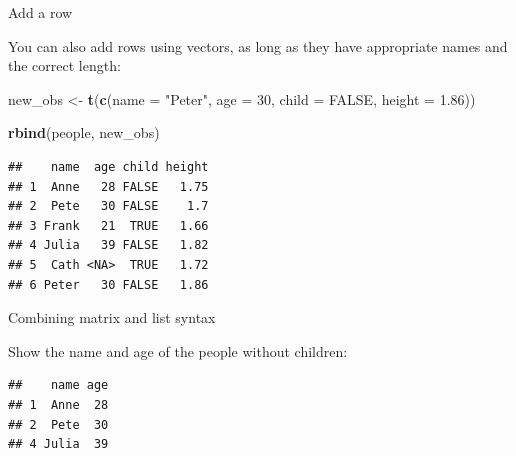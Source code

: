\documentclass[ignorenonframetext,]{beamer}
\newenvironment{Shaded}{\begin{snugshade}}{\end{snugshade}}
\newcommand{\DataTypeTok}[1]{\textcolor[rgb]{0.13,0.29,0.53}{#1}}
\newcommand{\DecValTok}[1]{\textcolor[rgb]{0.00,0.00,0.81}{#1}}
\newcommand{\FloatTok}[1]{\textcolor[rgb]{0.00,0.00,0.81}{#1}}
\newcommand{\KeywordTok}[1]{\textcolor[rgb]{0.13,0.29,0.53}{\textbf{#1}}}
\newcommand{\NormalTok}[1]{#1}
\newcommand{\OperatorTok}[1]{\textcolor[rgb]{0.81,0.36,0.00}{\textbf{#1}}}
\newcommand{\OtherTok}[1]{\textcolor[rgb]{0.56,0.35,0.01}{#1}}
\newcommand{\StringTok}[1]{\textcolor[rgb]{0.31,0.60,0.02}{#1}}
\begin{document}
\begin{frame}[fragile]{Add a row}
\protect\hypertarget{add-a-row-3}{}

You can also add rows using vectors, as long as they have appropriate
names and the correct length:

\begin{Shaded}
\begin{Highlighting}[]
\NormalTok{new_obs <-}\StringTok{ }\KeywordTok{t}\NormalTok{(}\KeywordTok{c}\NormalTok{(}\DataTypeTok{name =} \StringTok{"Peter"}\NormalTok{, }\DataTypeTok{age =} \DecValTok{30}\NormalTok{, }
               \DataTypeTok{child =} \OtherTok{FALSE}\NormalTok{, }\DataTypeTok{height =} \FloatTok{1.86}\NormalTok{))}

\KeywordTok{rbind}\NormalTok{(people, new_obs)}
\end{Highlighting}
\end{Shaded}

\begin{verbatim}
##    name  age child height
## 1  Anne   28 FALSE   1.75
## 2  Pete   30 FALSE    1.7
## 3 Frank   21  TRUE   1.66
## 4 Julia   39 FALSE   1.82
## 5  Cath <NA>  TRUE   1.72
## 6 Peter   30 FALSE   1.86
\end{verbatim}

\end{frame}

\begin{frame}[fragile]{Combining matrix and list syntax}
\protect\hypertarget{combining-matrix-and-list-syntax}{}

Show the name and age of the people without children:

\begin{Shaded}
\end{Shaded}

\begin{verbatim}
##    name age
## 1  Anne  28
## 2  Pete  30
## 4 Julia  39
\end{verbatim}

\end{frame}
\end{document}
